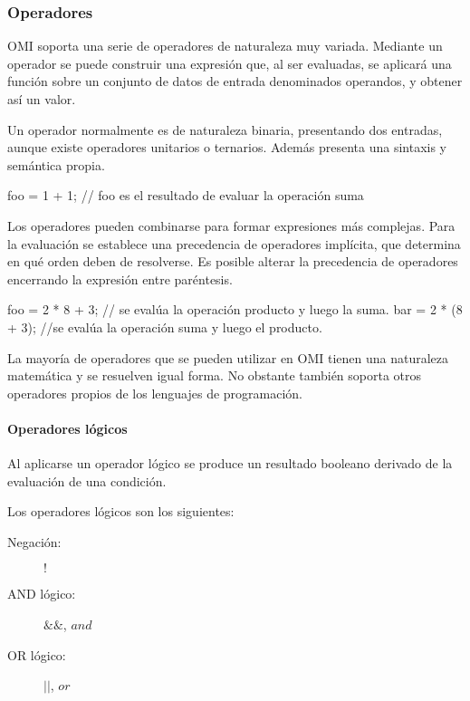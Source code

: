 \subsubsection{Operadores}
OMI soporta una serie de operadores de naturaleza muy variada. Mediante un operador se puede construir una expresión que, al ser evaluadas, se aplicará una función
sobre un conjunto de datos de entrada denominados operandos, y obtener así un valor.

Un operador normalmente es de naturaleza binaria, presentando dos entradas, aunque existe operadores unitarios o ternarios. Además presenta una sintaxis y semántica propia. \\

\begin{myverbatim}
   foo = 1 + 1; // foo es el resultado de evaluar la operación suma
\end{myverbatim} 

Los operadores pueden combinarse para formar expresiones más complejas. Para la evaluación se establece una precedencia de operadores implícita, que determina en qué orden 
deben de resolverse. Es posible alterar la precedencia de operadores encerrando la expresión entre paréntesis. \\

\begin{myverbatim}
   foo = 2 * 8 + 3; // se evalúa la operación producto y luego la suma.
   bar = 2 * (8 + 3); //se evalúa la operación suma y luego el producto.
\end{myverbatim} 

La mayoría de operadores que se pueden utilizar en OMI tienen una naturaleza matemática y se resuelven igual forma. No obstante también soporta otros operadores propios de
los lenguajes de programación. 

\paragraph{Operadores lógicos}\label{sec:op_bool}

Al aplicarse un operador lógico se produce un resultado booleano derivado de la evaluación de una condición. 

Los operadores lógicos son los siguientes:

\begin{description}
\item [Negación:] $!$
\item [AND lógico:] $\&\&$, $and$
\item [OR lógico:] $||$, $or$
\end{description} 

